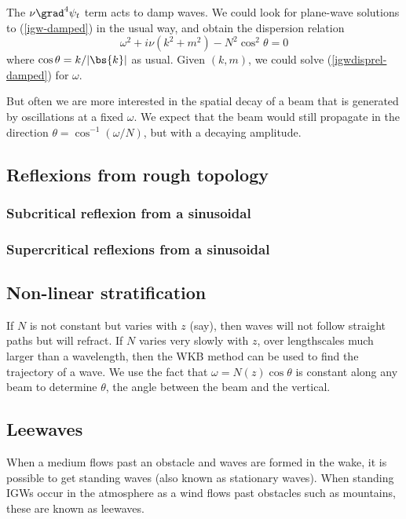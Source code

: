 The $\nu\grad^4\psi_t$ term acts to damp waves. We could look for plane-wave solutions to (\ref{igw-damped}) in the usual way, and obtain the dispersion relation
\begin{equation}
	\omega^2 + i\nu(k^2+m^2) - N^2\cos^2\theta = 0
	\label{igwdisprel-damped}
\end{equation}
where $\cos\theta = k/|\bs{k}|$ as usual. Given $(k,m)$, we could solve (\ref{igwdisprel-damped}) for $\omega$. 

But often we are more interested in the spatial decay of a beam that is generated by oscillations at a fixed $\omega$. We expect that the beam would still propagate in the direction $\theta = \cos^{-1} (\omega/N)$, but with a decaying amplitude.

\subsection{Reflexions from rough topology}

\subsubsection{Subcritical reflexion from a sinusoidal}
\subsubsection{Supercritical reflexions from a sinusoidal}

\subsection{Non-linear stratification}

If $N$ is not constant but varies with $z$ (say), then waves will not follow straight paths but will refract. If $N$ varies very slowly with $z$, over lengthscales much larger than a wavelength, then the WKB method can be used to find the trajectory of a wave. We use the fact that $\omega = N(z)\cos\theta$ is constant along any beam to determine $\theta$, the angle between the beam and the vertical. 



\subsection{Leewaves}

When a medium flows past an obstacle and waves are formed in the wake, it is possible to get standing waves (also known as stationary waves). When standing IGWs occur in the atmosphere as a wind flows past obstacles such as mountains, these are known as leewaves.

